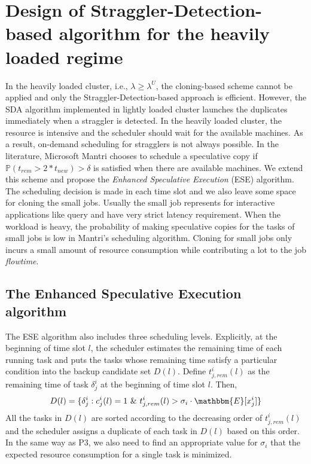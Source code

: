 \documentclass[10pt,conference]{IEEEtran}
\begin{document}
\section{Design of Straggler-Detection-based algorithm for the heavily loaded regime}
\label{ESE_design}
In the heavily loaded cluster, i.e., $\lambda \geq \lambda^U$, the cloning-based scheme cannot be applied and only the Straggler-Detection-based approach is efficient.  However, the SDA algorithm implemented in lightly loaded cluster launches the duplicates immediately when a straggler is detected. In the heavily loaded cluster, the resource is intensive and the scheduler should wait for the available machines. As a result, on-demand scheduling for stragglers is not always possible. In the literature, Microsoft Mantri {\cite{Outliers}} chooses to schedule a speculative copy if $\mathbb{P}(t_{rem}>2*t_{new}) > \delta$ is satisfied when there are available machines. We extend this scheme and propose the \textit{Enhanced Speculative Execution} (ESE) algorithm. The scheduling decision is made in each time slot and we also leave some space for cloning the small jobs. Usually the small job represents for interactive applications like query and have very strict latency requirement. When the workload is heavy, the probability of making speculative copies for the tasks of small jobs is low in Mantri's scheduling algorithm. Cloning for small jobs only incurs a small amount of resource consumption while contributing a lot to the job \textit{flowtime}.

\subsection{The Enhanced Speculative Execution algorithm}
The ESE algorithm also includes three scheduling levels. Explicitly, at the beginning of time slot $l$,  the scheduler estimates the remaining time of each running task and puts the tasks whose remaining time satisfy a particular condition into the backup candidate set $D(l)$. Define $t^i_{j,rem}(l)$ as the remaining time of task $\delta^i_j$ at the beginning of time slot $l$. Then,
$$D(l) = \{\delta^i_j:  c^i_j(l) = 1  \ \& \ t^i_{j,rem}(l)> \sigma_i \cdot  \mathbbm{E}[x^i_j] \}$$
All the tasks in $D(l)$ are sorted according to the decreasing order of  $t^i_{j,rem}(l)$ and the scheduler assigns  a duplicate of each task  in $D(l)$ based on this order.  In the same way as P3, we also need to find an appropriate value for $\sigma_i$ that the expected resource consumption for a single task is minimized.
\end{document}
